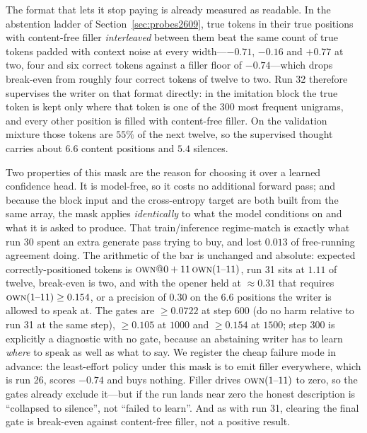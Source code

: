 \documentclass{article} %
\begin{document}
The format that lets it stop paying is already measured as readable. In the abstention ladder of
Section~\ref{sec:probes2609}, true tokens in their true positions with content-free filler
\emph{interleaved} between them beat the same count of true tokens padded with context noise at every
width---$-0.71$, $-0.16$ and $+0.77$ at two, four and six correct tokens against a filler floor of
$-0.74$---which drops break-even from roughly four correct tokens of twelve to two. Run 32 therefore
supervises the writer on that format directly: in the imitation block the true token is kept only
where that token is one of the $300$ most frequent unigrams, and every other position is filled with
content-free filler. On the validation mixture those tokens are $55\%$ of the next twelve, so the
supervised thought carries about $6.6$ content positions and $5.4$ silences.

Two properties of this mask are the reason for choosing it over a learned confidence head. It is
model-free, so it costs no additional forward pass; and because the block input and the
cross-entropy target are both built from the same array, the mask applies \emph{identically} to what
the model conditions on and what it is asked to produce. That train/inference regime-match is exactly
what run 30 spent an extra generate pass trying to buy, and lost $0.013$ of free-running agreement
doing. The arithmetic of the bar is unchanged and absolute: expected correctly-positioned tokens is
$\textsc{own}@0 + 11\,\textsc{own}(1\text{--}11)$, run 31 sits at $1.11$ of twelve, break-even is
two, and with the opener held at ${\approx}0.31$ that requires $\textsc{own}(1\text{--}11) \ge 0.154$,
or a precision of $0.30$ on the $6.6$ positions the writer is allowed to speak at. The gates are
$\ge 0.0722$ at step $600$ (do no harm relative to run 31 at the same step), $\ge 0.105$ at $1000$
and $\ge 0.154$ at $1500$; step $300$ is explicitly a diagnostic with no gate, because an abstaining
writer has to learn \emph{where} to speak as well as what to say. We register the cheap failure mode
in advance: the least-effort policy under this mask is to emit filler everywhere, which is run 26,
scores $-0.74$ and buys nothing. Filler drives $\textsc{own}(1\text{--}11)$ to zero, so the gates
already exclude it---but if the run lands near zero the honest description is ``collapsed to
silence'', not ``failed to learn''. And as with run 31, clearing the final gate is break-even against
content-free filler, not a positive result.
\end{document}
